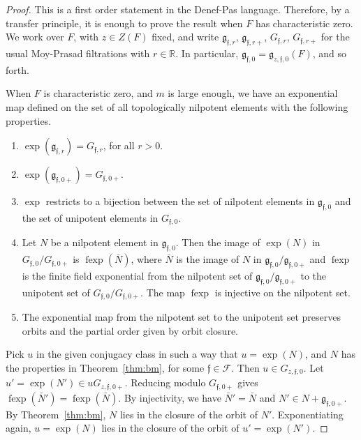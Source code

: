 \documentclass[12pt]{amsart}
\newcommand{\op}[1]{\operatorname{#1}}
\newcommand{\ring}[1]{{\mathbb #1}}
\def\s{{\mathfrak{f}}}
\newcommand{\cF}{\mathcal{F}}
\newcommand{\fg}{\mathfrak{g}}
\theoremstyle{plain}
\theoremstyle{definition}
\begin{document}
\begin{proof} This is a first order statement in the Denef-Pas
  language.  Therefore, by a transfer principle, it is enough to prove
  the result when $F$ has characteristic zero.  We work over $F$, with
  $z\in Z(F)$ fixed, and write $\fg_{\s,r}$, $\fg_{\s,r+}$, $G_{\s,r}$,
  $G_{\s,r+}$ for the usual Moy-Prasad filtrations with
  $r\in\ring{R}$.  In particular, $\fg_{\s,0}=\fg_{z,\s,0}(F)$, and so
  forth.

  When $F$ is characteristic zero, and $m$ is large enough, we have an
  exponential map defined on the set of all topologically nilpotent
  elements with the following properties.
  \begin{enumerate}
    \item $\exp(\fg_{\s,r}) = G_{\s,r}$, for all $r>0$.
    \item $\exp(\fg_{\s,0+}) = G_{\s,0+}$.
    \item $\exp$ restricts to a bijection between the set of
      nilpotent elements in $\fg_{\s,0}$ and the set of unipotent
      elements in $G_{\s,0}$.
   \item Let $N$ be a nilpotent element in $\fg_{\s,0}$.  Then the
     image of $\exp(N)$ in $G_{\s,0}/G_{\s,0+}$ is $\op{fexp}(\bar N)$,
     where $\bar N$ is the image of $N$ in $\fg_{\s,0}/\fg_{\s,0+}$ and
     $\op{fexp}$ is the finite field exponential from the nilpotent
     set of $\fg_{\s,0}/\fg_{\s,0+}$ to the unipotent set of
     $G_{\s,0}/G_{\s,0+}$. The map $\op{fexp}$ is injective on the
     nilpotent set.
   \item The exponential map from the nilpotent set to the unipotent
     set preserves orbits and the partial order given by orbit closure.
 \end{enumerate}

  Pick $u$ in the given conjugacy class in such a way that $u =
  \exp(N)$, and $N$ has the properties in Theorem~\ref{thm:bm}, for
  some $\s\in \cF$.
  Then $u\in G_{z,\s,0}$.  Let $u' = \exp(N') \in u G_{z,\s,0+}$.
  Reducing modulo
  $G_{\s,0+}$ gives $\op{fexp}(\bar N') = \op{fexp}(\bar N)$. By
  injectivity, we have $\bar N' = \bar N$ and $N' \in N +
  \fg_{\s,0+}$.  By Theorem~\ref{thm:bm}, $N$ lies in the closure of the
  orbit of $N'$.  Exponentiating again, $u = \exp(N)$ lies in the
  closure of the orbit of $u' = \exp(N')$.
\end{proof}
\end{document}
